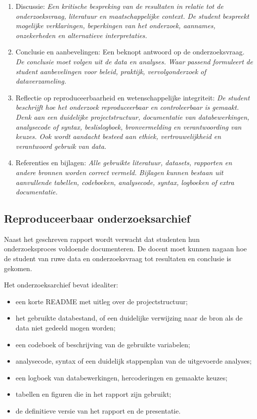 \documentclass[
  letterpaper,
  DIV=11,
  numbers=noendperiod]{scrreprt}
\providecommand{\tightlist}{%
  \setlength{\itemsep}{0pt}\setlength{\parskip}{0pt}}
\begin{document}
\begin{enumerate}
{  resultaten, met relevante tabellen en/of figuren. De student
  presenteert niet alleen statistische output, maar geeft ook een
  duidelijke interpretatie van wat de resultaten betekenen.}
\item
  Discussie: \emph{Een kritische bespreking van de resultaten in relatie
  tot de onderzoeksvraag, literatuur en maatschappelijke context. De
  student bespreekt mogelijke verklaringen, beperkingen van het
  onderzoek, aannames, onzekerheden en alternatieve interpretaties.}
\item
  Conclusie en aanbevelingen: Een beknopt antwoord op de
  onderzoeksvraag. \emph{De conclusie moet volgen uit de data en
  analyses. Waar passend formuleert de student aanbevelingen voor
  beleid, praktijk, vervolgonderzoek of dataverzameling.}
\item
  Reflectie op reproduceerbaarheid en wetenschappelijke integriteit:
  \emph{De student beschrijft hoe het onderzoek reproduceerbaar en
  controleerbaar is gemaakt. Denk aan een duidelijke projectstructuur,
  documentatie van databewerkingen, analysecode of syntax,
  beslislogboek, bronvermelding en verantwoording van keuzes. Ook wordt
  aandacht besteed aan ethiek, vertrouwelijkheid en verantwoord gebruik
  van data.}
\item
  Referenties en bijlagen: \emph{Alle gebruikte literatuur, datasets,
  rapporten en andere bronnen worden correct vermeld. Bijlagen kunnen
  bestaan uit aanvullende tabellen, codeboeken, analysecode, syntax,
  logboeken of extra documentatie.}
\end{enumerate}

\subsection*{Reproduceerbaar onderzoeksarchief}\label{sec-archive}

Naast het geschreven rapport wordt verwacht dat studenten hun
onderzoeksproces voldoende documenteren. De docent moet kunnen nagaan
hoe de student van ruwe data en onderzoeksvraag tot resultaten en
conclusie is gekomen.

Het onderzoeksarchief bevat idealiter:

\begin{itemize}
\tightlist
\item
  een korte README met uitleg over de projectstructuur;
\item
  het gebruikte databestand, of een duidelijke verwijzing naar de bron
  als de data niet gedeeld mogen worden;
\item
  een codeboek of beschrijving van de gebruikte variabelen;
\item
  analysecode, syntax of een duidelijk stappenplan van de uitgevoerde
  analyses;
\item
  een logboek van databewerkingen, hercoderingen en gemaakte keuzes;
\item
  tabellen en figuren die in het rapport zijn gebruikt;
\item
  de definitieve versie van het rapport en de presentatie.
\end{itemize}
\end{document}
